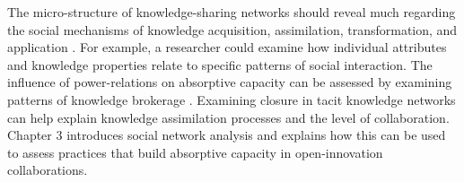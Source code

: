 The micro-structure of knowledge-sharing networks should reveal much regarding the social mechanisms of knowledge acquisition, assimilation, transformation, and application \citep{reagans2003network,phelps2012knowledge,tortoriello2010activating,tortoriello2015social}. For example, a researcher could examine how individual attributes and knowledge properties relate to specific patterns of social interaction. The influence of power-relations on absorptive capacity can be assessed by examining patterns of knowledge brokerage \citep{burt2004structural,obstfeld2005social,obstfeld2014brokerage}. Examining closure in tacit knowledge networks can help explain knowledge assimilation processes and the level of collaboration. Chapter 3  introduces social network analysis and explains how this can be used to assess practices that build absorptive capacity in open-innovation collaborations. \medskip






